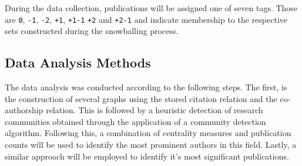 \documentclass[11pt,a4paper]{book}
\theoremstyle{definition}
\theoremstyle{definition}
\theoremstyle{definition}
\theoremstyle{remark}
\begin{document}
During the data collection, publications will be assigned one of seven tags. Those are \texttt{0}, \texttt{-1}, \texttt{-2}, \texttt{+1}, \texttt{+1-1} \texttt{+2}  and \texttt{+2-1} and indicate membership to the respective sets constructed during the snowballing process.




%    
%     
%     
%     
%     
     


\subsection{Data Analysis Methods}
\label{subsec:data_analysis}
The data analysis was conducted according to the following steps. The first, is the construction of several graphs using the stored citation relation and the co-authorship relation. This is followed by a heuristic detection of research communities obtained through the application of a community detection algorithm. Following this, a combination of centrality measures and publication counts will be used to identify the most prominent authors in this field. Lastly, a similar approach will be employed to identify it's most significant publications.
\end{document}
